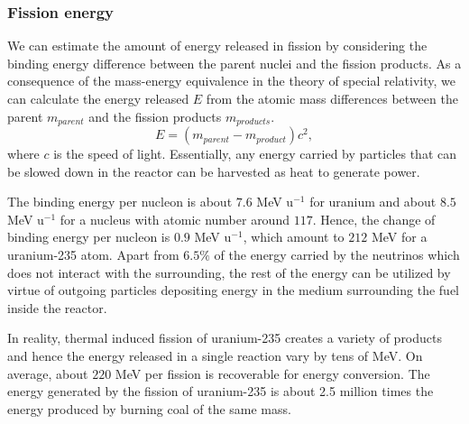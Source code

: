\documentclass[nofootinbib,preprint,aps]{revtex4-1}
\begin{document}
        \subsubsection{Fission energy}
        We can estimate the amount of energy released in fission by considering the binding energy difference
        between the parent nuclei and the fission products. As a consequence of the mass-energy equivalence in the theory
        of special relativity, we can calculate the energy released $E$ from the atomic mass differences between the parent $m_{parent}$
        and the fission products $m_{products}$.
        \begin{equation}
            E = (m_{parent}-m_{product})c^2,
        \end{equation}
        where $c$ is the speed of light.
        Essentially, any energy carried by particles that can be slowed down 
        in the reactor can be harvested as heat to generate power.

        The binding energy per nucleon is about $7.6$ MeV u${}^{-1}$ for uranium and about $8.5$ MeV u${}^{-1}$
        for a nucleus with atomic number around $117$. Hence, the change of binding energy per nucleon is
        $0.9$ MeV u${}^{-1}$, which amount to $212$ MeV for a uranium-235 atom.
        Apart from $6.5\%$ of the energy carried by the neutrinos which does not interact with the surrounding,
        the rest of the energy can be utilized by virtue of outgoing particles depositing energy in the medium
        surrounding the fuel inside the reactor.

        In reality, thermal induced fission of uranium-235 creates a variety of products and hence the energy released
        in a single reaction vary by tens of MeV. On average, about $220$ MeV per fission is recoverable for energy conversion.
        The energy generated by the fission of uranium-235 is 
        about 2.5 million times the energy produced by burning coal of the same mass.\cite{e17}
\end{document}
